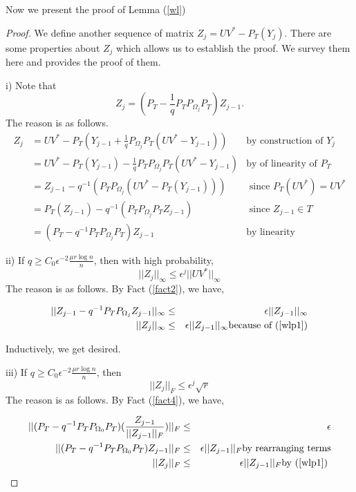 Now we present the proof of Lemma (\ref{wl})

\begin{proof}
We define another sequence of matrix $Z_{j}=UV^{*}-P_{T}(Y_{j})$. There are some properties about $Z_{j}$ which allows us to establish the proof. We survey them here and provides the proof of them.

i) Note that 
\begin{equation}
Z_{j}=(P_{T}-\frac{1}{q}P_{T}P_{\Omega_{j}}P_{T})Z_{j-1}. \label{wlp1}
\end{equation}
The reason is as follows.
\begin{align*}
Z_{j}
 & = UV^{*}-P_{T}(Y_{j-1}+\frac{1}{q}P_{\Omega_{j}}P_{T}(UV^{*}-Y_{j-1})) &\text{by construction of } Y_j \\
 & = UV^{*}-P_{T}(Y_{j-1})-\frac{1}{q}P_{T}P_{\Omega_{j}}P_{T}(UV^{*}-Y_{j-1}) &\text{by of linearity of }P_{T}\\
 & = Z_{j-1}-q^{-1}(P_{T}P_{\Omega_{j}}(UV^{*}-P_{T}(Y_{j-1}))) &\text{ since }P_{T}(UV^{*})=UV^{*}\\
 & = P_{T}(Z_{j-1})-q^{-1}(P_{T}P_{\Omega_{j}}P_{T}Z_{j-1}) &\text{ since }Z_{j-1}\in T\\
 & = (P_{T}-q^{-1}P_{T}P_{\Omega_{j}}P_{T})Z_{j-1} &\text{by linearity }
\end{align*}


ii) If $q\ge C_{0}\epsilon^{-2}\frac{\mu r\log n}{n}$, then  with high probability, 
\begin{equation} 
||Z_{j}||_{\infty}\le\epsilon^{j}||UV^{*}||_{\infty} \label{wlp2}
\end{equation}
 The reason is as follows. By Fact (\ref{fact2}), we have,

\begin{eqnarray*}
||Z_{j-1}-q^{-1}P_{T}P_{\Omega_{j}}Z_{j-1}||_{\infty} & \le & \epsilon||Z_{j-1}||_{\infty} \\
||Z_{j}||_{\infty} & \le & \epsilon||Z_{j-1}||_{\infty} \text{because of (\ref{wlp1})}
\end{eqnarray*}


Inductively, we get desired.

iii) If $q\ge C_{0}\epsilon^{-2}\frac{\mu r\log n}{n}$, then 
\begin{equation} 
||Z_{j}||_{F}\le\epsilon^{j}\sqrt{r}  \label{wlp3}
\end{equation} 
The reason is as follows. By Fact (\ref{fact4}), we have,

\begin{eqnarray*}
||(P_{T}-q^{-1}P_{T}P_{\Omega_{0}}P_{T})(\frac{Z_{j-1}}{||Z_{j-1}||_{F}})||_{F} & \le & \epsilon\\
||(P_{T}-q^{-1}P_{T}P_{\Omega_{0}}P_{T})Z_{j-1}||_{F} & \le & \epsilon||Z_{j-1}||_{F} \text{by rearranging terms}\\
||Z_{j}||_{F} & \le & \epsilon||Z_{j-1}||_{F} \text{by (\ref{wlp1}) }
\end{eqnarray*}



\end{proof}
